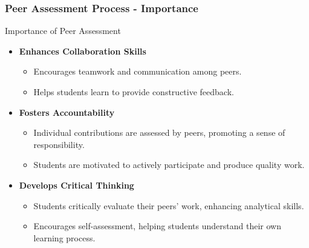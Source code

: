 \documentclass{beamer}
\begin{document}
\begin{frame}[fragile]
    \frametitle{Peer Assessment Process - Importance}
    \begin{block}{Importance of Peer Assessment}
        \begin{itemize}
            \item \textbf{Enhances Collaboration Skills}
            \begin{itemize}
                \item Encourages teamwork and communication among peers.
                \item Helps students learn to provide constructive feedback.
            \end{itemize}
            \item \textbf{Fosters Accountability}
            \begin{itemize}
                \item Individual contributions are assessed by peers, promoting a sense of responsibility.
                \item Students are motivated to actively participate and produce quality work.
            \end{itemize}
            \item \textbf{Develops Critical Thinking}
            \begin{itemize}
                \item Students critically evaluate their peers' work, enhancing analytical skills.
                \item Encourages self-assessment, helping students understand their own learning process.
            \end{itemize}
        \end{itemize}
    \end{block}
\end{frame}
\end{document}
